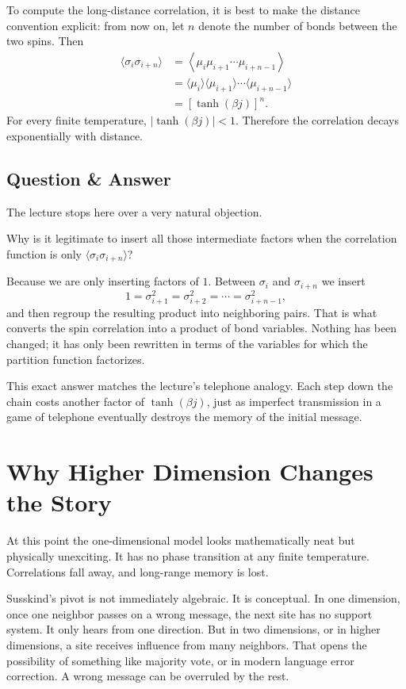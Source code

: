 To compute the long-distance correlation, it is best to make the distance convention explicit: from now on, let \(n\) denote the number of bonds between the two spins. Then
\begin{align}
\langle \sigma_i \sigma_{i+n}\rangle
&= \left\langle \mu_i \mu_{i+1}\cdots \mu_{i+n-1}\right\rangle \\
&= \langle \mu_i\rangle \langle \mu_{i+1}\rangle \cdots \langle \mu_{i+n-1}\rangle \\
&= [\tanh(\beta j)]^n.
\end{align}
For every finite temperature, \(|\tanh(\beta j)|<1\). Therefore the correlation decays exponentially with distance.

\subsection{Question \& Answer}

The lecture stops here over a very natural objection.

Why is it legitimate to insert all those intermediate factors when the correlation function is only \(\langle \sigma_i \sigma_{i+n}\rangle\)?

Because we are only inserting factors of \(1\). Between \(\sigma_i\) and \(\sigma_{i+n}\) we insert
\begin{equation}
1=\sigma_{i+1}^2=\sigma_{i+2}^2=\cdots=\sigma_{i+n-1}^2,
\end{equation}
and then regroup the resulting product into neighboring pairs. That is what converts the spin correlation into a product of bond variables. Nothing has been changed; it has only been rewritten in terms of the variables for which the partition function factorizes.

This exact answer matches the lecture's telephone analogy. Each step down the chain costs another factor of \(\tanh(\beta j)\), just as imperfect transmission in a game of telephone eventually destroys the memory of the initial message.

\section{Why Higher Dimension Changes the Story}

At this point the one-dimensional model looks mathematically neat but physically unexciting. It has no phase transition at any finite temperature. Correlations fall away, and long-range memory is lost.

Susskind's pivot is not immediately algebraic. It is conceptual. In one dimension, once one neighbor passes on a wrong message, the next site has no support system. It only hears from one direction. But in two dimensions, or in higher dimensions, a site receives influence from many neighbors. That opens the possibility of something like majority vote, or in modern language error correction. A wrong message can be overruled by the rest.

